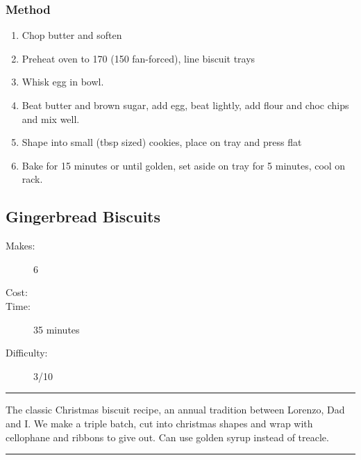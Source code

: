 \documentclass[]{article}
\begin{document}
\subsubsection*{\Large Method}
\begin{enumerate}[font=\huge\color{accent}]
	\item Chop butter and soften
	\item Preheat oven to 170 (150 fan-forced), line biscuit trays
	\item Whisk egg in bowl.
	\item Beat butter and brown sugar, add egg, beat lightly, add flour and choc chips and mix well.
	\item Shape into small (tbsp sized) cookies, place on tray and press flat
	\item Bake for 15 minutes or until golden, set aside on tray for 5 minutes, cool on rack.
\end{enumerate}
\newpage
{}\label{rec:Gingerbread Biscuits}
\subsection*{\center\huge Gingerbread Biscuits}
\begin{description}
\item[Makes:] 6 
\item[Cost:] \textdollar
\item[Time:] 35 minutes
\item[Difficulty:] 3/10
\end{description}
\vspace{0.2cm}\hrule\vspace{0.5cm}
\begin{adjustwidth}{0.5 cm}{0.5 cm}

The classic Christmas biscuit recipe, an annual tradition between Lorenzo, Dad and I. We make a triple batch, cut into christmas shapes and wrap with cellophane and ribbons to give out. Can use golden syrup instead of treacle. \hfill{}\color{black}

\end{adjustwidth}
\vspace{0.5cm}\hrule
\end{document}
